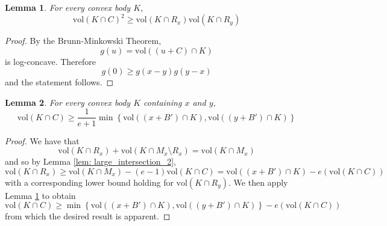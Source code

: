 \documentclass{article}
\newcommand{\vol}{\mathrm{vol}}
\newcommand{\set}[1]{\left\{#1\right\}}
\newcommand{\1}{\mathbf{1}}
\theoremstyle{alden}
\theoremstyle{aldenthm}
\newtheorem{lemma}{Lemma}
\theoremstyle{remark}
\begin{document}
\begin{lemma}
	\label{lem: large_intersection_3}
	For every convex body $K$,
	\begin{equation*}
	\vol(K \cap C)^2 \geq \vol(K \cap R_x) \vol(K \cap R_y)
	\end{equation*}
\end{lemma}
\begin{proof}
	By the Brunn-Minkowski Theorem,
	\begin{equation*}
	g(u) = \vol((u + C) \cap K)
	\end{equation*}
	is log-concave. Therefore
	\begin{equation*}
	g(0) \geq g(x - y)g(y - x)
	\end{equation*}
	and the statement follows.
\end{proof}

\begin{lemma}
	\label{lem: large_intersection_4}
	For every convex body $K$ containing $x$ and $y$,
	\begin{equation*}
	\vol(K \cap C) \geq \frac{1}{e + 1} \min \set{\vol((x + B') \cap K), \vol((y + B') \cap K)}
	\end{equation*}
\end{lemma}
\begin{proof}
	We have that
	\begin{equation*}
	\vol(K \cap R_x) + \vol(K \cap M_x \setminus R_x) = \vol(K \cap M_x)
	\end{equation*}
	and so by Lemma \ref{lem: large_intersection_2}, 
	\begin{equation*}
	\vol(K \cap R_x) \geq \vol(K \cap M_x) - (e - 1) \vol(K \cap C) = \vol((x + B') \cap K) - e(\vol(K \cap C))
	\end{equation*}
	with a corresponding lower bound holding for $\vol(K \cap R_y)$. We then apply Lemma \ref{lem: large_intersection_3} to obtain
	\begin{equation*}
	\vol(K \cap C) \geq \min\set{\vol((x + B') \cap K), \vol((y + B') \cap K)} - e(\vol(K \cap C))
	\end{equation*}
	from which the desired result is apparent.
\end{proof}
\end{document}
